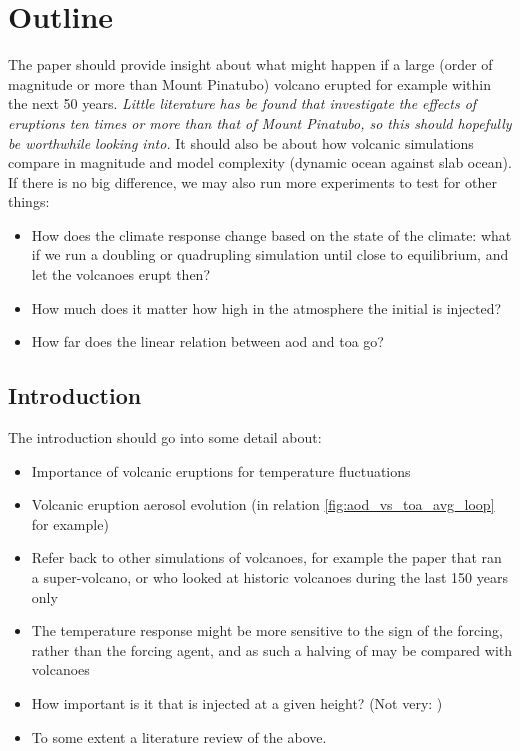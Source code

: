 \documentclass[twocol]{ametsocV5}
\begin{document}
\section{Outline}

The paper should provide insight about what might happen if a large (order of magnitude
or more than Mount Pinatubo) volcano erupted for example within the next 50 years.
\emph{Little literature has be found that investigate the effects of eruptions ten times
  or more than that of Mount Pinatubo, so this should hopefully be worthwhile looking
  into.} It should also be about how volcanic simulations compare in magnitude and model
complexity (dynamic ocean against slab ocean). If there is no big difference, we may
also run more experiments to test for other things:
\begin{itemize}
  \item How does the climate response change based on the state of the climate: what if we run a
         doubling or quadrupling simulation until close to equilibrium, and let the
        volcanoes erupt then?
  \item How much does it matter how high in the atmosphere the initial  is injected?
  \item How far does the linear relation between \acrshort{aod} and \acrshort{toa} go?
\end{itemize}

\subsection*{Introduction}

The introduction should go into some detail about:

\begin{itemize}
  \item Importance of volcanic eruptions for temperature fluctuations
  \item Volcanic eruption aerosol evolution (in relation \cref{fig:aod_vs_toa_avg_loop} for
        example)
  \item Refer back to other simulations of volcanoes, for example the \citet{jones2005} paper
        that ran a super-volcano, or \citet{gregory2016} who looked at historic volcanoes during
        the last 150 years only
  \item The temperature response might be more sensitive to the sign of the forcing, rather than
        the forcing agent, and as such a halving of  may be compared with volcanoes
        \citep{gunther2022}
  \item How important is it that  is injected at a given height? (Not very:
        \citet{marshall2019})
  \item To some extent a literature review of the above.
\end{itemize}
\end{document}
